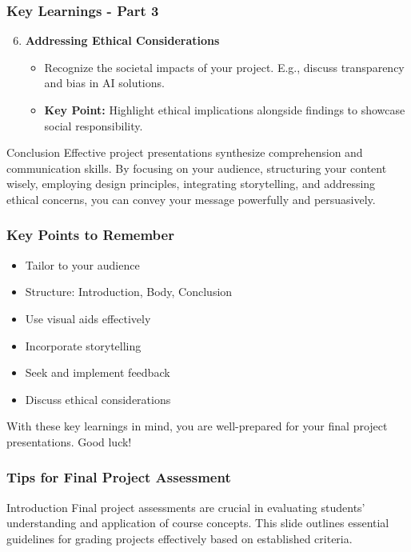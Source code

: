 \documentclass[aspectratio=169]{beamer}
\begin{document}
\begin{frame}[fragile]
    \frametitle{Key Learnings - Part 3}

    \begin{enumerate}
        \setcounter{enumi}{5} %

        \item \textbf{Addressing Ethical Considerations}
        \begin{itemize}
            \item Recognize the societal impacts of your project. E.g., discuss transparency and bias in AI solutions.
            \item \textbf{Key Point:} Highlight ethical implications alongside findings to showcase social responsibility.
        \end{itemize}
    \end{enumerate}

    \begin{block}{Conclusion}
        Effective project presentations synthesize comprehension and communication skills. By focusing on your audience, structuring your content wisely, employing design principles, integrating storytelling, and addressing ethical concerns, you can convey your message powerfully and persuasively.
    \end{block}
\end{frame}

\begin{frame}[fragile]
    \frametitle{Key Points to Remember}

    \begin{itemize}
        \item Tailor to your audience
        \item Structure: Introduction, Body, Conclusion
        \item Use visual aids effectively
        \item Incorporate storytelling
        \item Seek and implement feedback
        \item Discuss ethical considerations
    \end{itemize}

    With these key learnings in mind, you are well-prepared for your final project presentations. Good luck!
\end{frame}

\begin{frame}[fragile]
    \frametitle{Tips for Final Project Assessment}
    \begin{block}{Introduction}
        Final project assessments are crucial in evaluating students' understanding and application of course concepts. This slide outlines essential guidelines for grading projects effectively based on established criteria.
    \end{block}
\end{frame}
\end{document}
